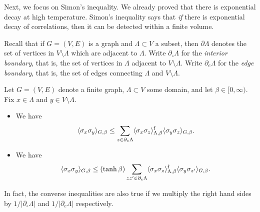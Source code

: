 Next, we focus on Simon's inequality.
We already proved that there is exponential decay at high temperature.
Simon's inequality says that \emph{if} there is exponential decay of correlations,
then it can be detected within a finite volume.

Recall that if $G=(V,E)$ is a graph and $\Lambda\subset V$
a subset, then $\partial\Lambda$ denotes the set of vertices in $V\setminus\Lambda$
which are adjacent to $\Lambda$.
Write $\partial_\circ\Lambda$ for the \emph{interior boundary},
that is, the set of vertices in $\Lambda$ adjacent to $V\setminus\Lambda$.
Write $\partial_e\Lambda$ for the \emph{edge boundary},
that is, the set of edges connecting $\Lambda$ and $V\setminus\Lambda$.

\begin{theorem}
    Let $G=(V,E)$ denote a finite graph,
    $\Lambda\subset V$ some domain,
    and let $\beta\in[0,\infty)$.
    Fix $x\in \Lambda$ and $y\in V\setminus\Lambda$.
    \begin{itemize}
        \item We have
            \[
                \langle\sigma_x\sigma_y\rangle_{G,\beta}
                \leq
                \sum_{z\in\partial_\circ\Lambda}
                \langle\sigma_x\sigma_z\rangle_{\Lambda,\beta}^{\operatorname{f}}
                \langle\sigma_y\sigma_z\rangle_{G,\beta}.
            \]
        \item We have
            \[
                \langle\sigma_x\sigma_y\rangle_{G,\beta}
                \leq
                (\tanh\beta)
                \sum_{zz'\in\partial_e\Lambda}
                \langle\sigma_x\sigma_z\rangle_{\Lambda,\beta}^{\operatorname{f}}
                \langle\sigma_y\sigma_{z'}\rangle_{G,\beta}.
            \]
    \end{itemize}
    In fact, the converse inequalities are also true if we
    multiply the right hand sides by $1/|\partial_\circ\Lambda|$
    and $1/|\partial_e\Lambda|$ respectively.
\end{theorem}

